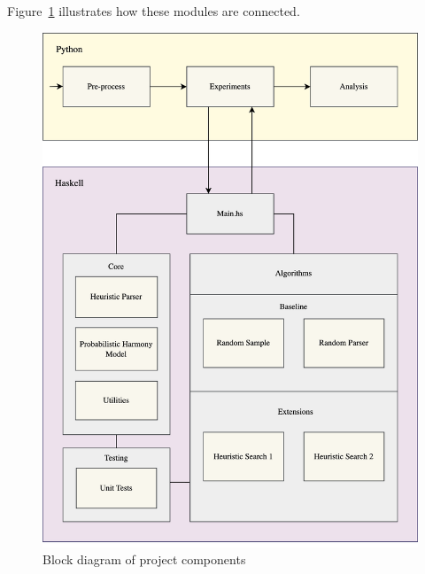 \documentclass[12pt,a4paper,twoside,openright]{report}
\theoremstyle{definition}
\begin{document}
Figure~\ref{fig:blockDiagram} illustrates how these modules are connected. 

\begin{figure}[h]
  \centering
  \includegraphics[width=\textwidth]{blockDiagram.png}
  \caption{Block diagram of project components}
  \label{fig:blockDiagram}
\end{figure}
\end{document}
